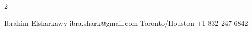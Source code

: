 \documentclass[lighthipster]{simplehipstercv}
\newlength{\rightcolwidth}
\begin{document}
\begin{paracol}{2}








\setlength{\parindent}{0pt}
\begin{minipage}[t]{\rightcolwidth}
\begin{center}\fontfamily{\sfdefault}\selectfont \color{black!70}
{\small Ibrahim Elsharkawy  ibra.shark@gmail.com  Toronto/Houston  +1 832-247-6842 
}
\end{center}
\end{minipage}

\end{paracol}
\end{document}
